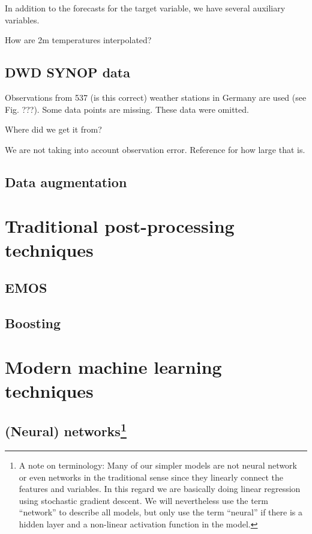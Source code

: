 \documentclass[a4paper,10pt]{scrartcl}
\begin{document}
In addition to the forecasts for the target variable, we have several auxiliary variables.

How are 2m temperatures interpolated?

\subsection{DWD SYNOP data}
Observations from 537 (is this correct) weather stations in Germany are used (see Fig. ???). Some data points are missing. These data were omitted.

Where did we get it from?

We are not taking into account observation error. Reference for how large that is.

\subsection{Data augmentation}

\section{Traditional post-processing techniques}

\subsection{EMOS}

\subsection{Boosting}

\section{Modern machine learning techniques}

\subsection{(Neural) networks\protect\footnote{A note on terminology: Many of our simpler models are not neural network or even networks in the traditional sense since they linearly connect the features and variables. In this regard we are basically doing linear regression using stochastic gradient descent. We will nevertheless use the term ``network'' to describe all models, but only use the term ``neural'' if there is a hidden layer and a non-linear activation function in the model.}}
\end{document}
